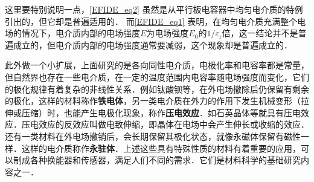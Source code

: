 这里要特别说明一点，\autoref{EFIDE_eq2} 虽然是从平行板电容器中均匀电介质的特例引出的，但它却是普遍适用的．
而\autoref{EFIDE_eq1} 表明，在均匀电介质充满整个电场的情况下，电介质内部的电场强度$E $为电场强度$E_0$的$1/\varepsilon_{\mathrm{r}}$倍，这一结论并不是普遍成立的，但电介质内部的电场强度通常要减弱，这个现象却是普遍成立的．

此外做一个小扩展，上面研究的是各向同性电介质，电极化率和电容率都是常量，但自然界也存在一些电介质，在一定的温度范围内电容率随电场强度而变化，它们的极化规律有着复杂的非线性关系．例如钛酸钡等，在外电场撤除后仍保留有剩余的极化，这样的材料称作\textbf{铁电体}，另一类电介质在外力的作用下发生机械变形（拉伸或压缩）时，也能产生电极化现象，称作\textbf{压电效应}．如石英晶体等就具有压电效应．压电效应的反效应叫做电致伸缩，即晶体在电场中会产生伸长或收缩的效应．还有一类材料在外电场撤销后，会长期保留其极化状态，就像永磁体保留有磁性一样．这样的电介质称作\textbf{永驻体}．上述这些具有特殊性质的材料有着重要的应用，可以制成各种换能器和传感器，满足人们不同的需求．它们是材料科学的基础研究内容之一．
